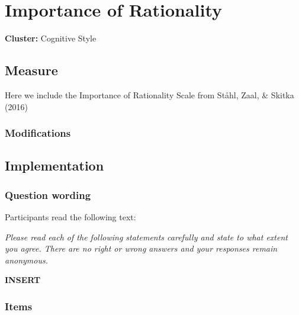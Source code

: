 \documentclass[
  letterpaper,
]{scrbook}
\begin{document}
\chapter{Importance of Rationality}\label{importance-of-rationality}

\textbf{Cluster:} Cognitive Style

\section{Measure}\label{measure-17}

Here we include the Importance of Rationality Scale from Ståhl, Zaal, \&
Skitka (2016)

\subsection*{Modifications}\label{modifications-15}

\section{Implementation}\label{implementation-17}

\subsection*{Question wording}\label{question-wording-17}

Participants read the following text:

\emph{Please read each of the following statements carefully and state
to what extent you agree. There are no right or wrong answers and your
responses remain anonymous.}

\textbf{INSERT}

\subsection*{Items}\label{items-17}
\end{document}
